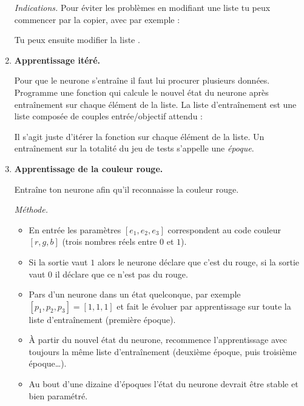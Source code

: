 \documentclass[11pt,class=report,crop=false]{standalone}
\begin{document}
\begin{activite}[Neurone]
\begin{enumerate}
\begin{itemize}
	\end{itemize}	
		
	
	\emph{Indications.} Pour éviter les problèmes en modifiant une liste tu peux commencer par la copier, avec par exemple :	
	
	Tu peux ensuite modifier la liste .
	
	\item  \textbf{Apprentissage itéré.}
	
	Pour que le neurone s'entraîne il faut lui procurer plusieurs données.
	Programme une fonction 
	qui calcule le nouvel état du neurone après entraînement sur chaque élément de la liste.
	La liste d'entraînement est une liste composée de couples entrée/objectif attendu : 	
	\mycenterline{\ci{[ ([1,0,0],1), ([0,1,1],0), ([0,1,0],0), ... ]}}
	
	Il s'agit juste d'itérer la fonction  sur chaque élément de la liste. 
	Un entraînement sur la totalité du jeu de tests s'appelle une \emph{époque}.
	
	\item  \textbf{Apprentissage de la couleur rouge.}
	
	Entraîne ton neurone afin qu'il reconnaisse la couleur rouge.
	
\medskip
	
	\emph{Méthode.}
	\begin{itemize}
		\item En entrée les paramètres $[e_1,e_2,e_3]$ correspondent au code couleur $[r,g,b]$ (trois nombres réels entre $0$ et $1$).
		\item Si la sortie vaut $1$ alors le neurone déclare que c'est du rouge, si la sortie vaut $0$ il déclare que ce n'est pas du rouge.
		\item Pars d'un neurone dans un état quelconque, par exemple $[p_1,p_2,p_3]=[1,1,1]$ et fait le évoluer par apprentissage sur toute la liste d'entraînement (première époque).
		\item \`A partir du nouvel état du neurone, recommence l'apprentissage avec toujours la même liste d'entraînement (deuxième époque, puis troisième époque\ldots). 
		\item Au bout d'une dizaine d'époques l'état du neurone devrait être stable et bien paramétré.
	\end{itemize}

\medskip


\end{enumerate}
\end{activite}
\end{document}
